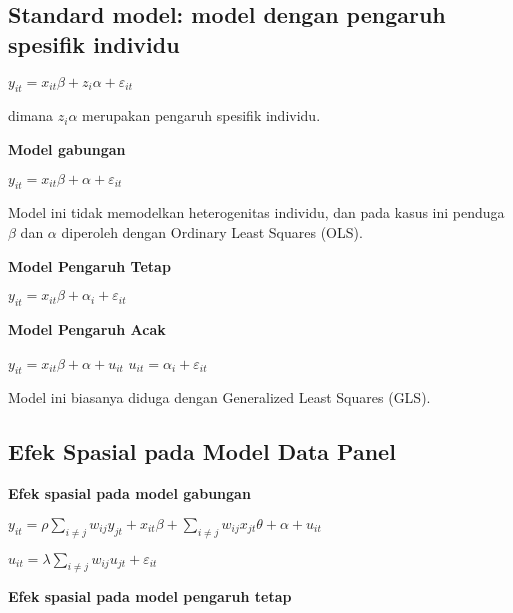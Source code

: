 \documentclass[
]{book}
\begin{document}
\hypertarget{standard-model-model-dengan-pengaruh-spesifik-individu}{%
\subsection{Standard model: model dengan pengaruh spesifik individu}\label{standard-model-model-dengan-pengaruh-spesifik-individu}}

\(y_{it}=x_{it}\beta + z_i\alpha + \varepsilon_{it}\)

dimana \(z_i\alpha\) merupakan pengaruh spesifik individu.

\textbf{Model gabungan}

\(y_{it}=x_{it}\beta + \alpha + \varepsilon_{it}\)

Model ini tidak memodelkan heterogenitas individu, dan pada kasus ini penduga \(\beta\) dan \(\alpha\) diperoleh dengan Ordinary Least Squares (OLS).

\textbf{Model Pengaruh Tetap}

\(y_{it}=x_{it}\beta + \alpha_i + \varepsilon_{it}\)

\textbf{Model Pengaruh Acak}

\(y_{it}=x_{it}\beta + \alpha + u_{it}\)
\(u_{it}=\alpha_i + \varepsilon_{it}\)

Model ini biasanya diduga dengan Generalized Least Squares (GLS).

\hypertarget{efek-spasial-pada-model-data-panel}{%
\subsection{Efek Spasial pada Model Data Panel}\label{efek-spasial-pada-model-data-panel}}

\textbf{Efek spasial pada model gabungan}

\(y_{it}=\rho\sum_{i \ne j} w_{ij} y_{jt} + x_{it}\beta + \sum_{i \ne j} w_{ij} x_{jt} \theta + \alpha + u_{it}\)

\(u_{it}=\lambda \sum_{i \ne j} w_{ij} u_{jt} + \varepsilon_{it}\)

\textbf{Efek spasial pada model pengaruh tetap}
\end{document}
